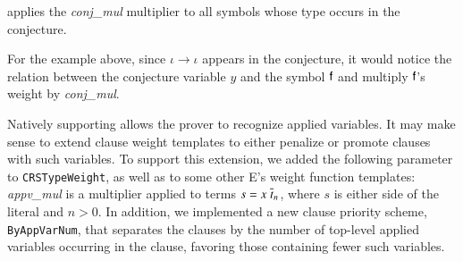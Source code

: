   applies the \textit{conj\_mul} multiplier to all symbols whose type
  occurs in the conjecture. \begin{rep}For the example above, since $\iota \to
  \iota$ appears in the conjecture, it would notice the relation between the
  conjecture variable $y$ and the symbol $\mathsf{f}$ and multiply $\mathsf{f}$'s
  weight by \textit{conj\_mul}.
  
  Natively supporting \lfhol{} allows the prover to recognize
  applied variables. It may make sense to extend clause weight templates to either
  penalize or promote clauses with such variables. To
  support this extension, we added the following parameter to \texttt{CRSTypeWeight},
  as well as to some other E's weight
  function templates:
  \textit{appv\_mul} is a multiplier applied to terms $s = x \; \overline{t}_{n}$, where $s$
    is either side of the literal and $n>0$. %
  In addition, we implemented a new clause priority scheme,
  \texttt{ByAppVarNum}, that separates the clauses by the number of top-level
  applied variables occurring in the clause, favoring those containing fewer
  such variables.
  \end{rep}

